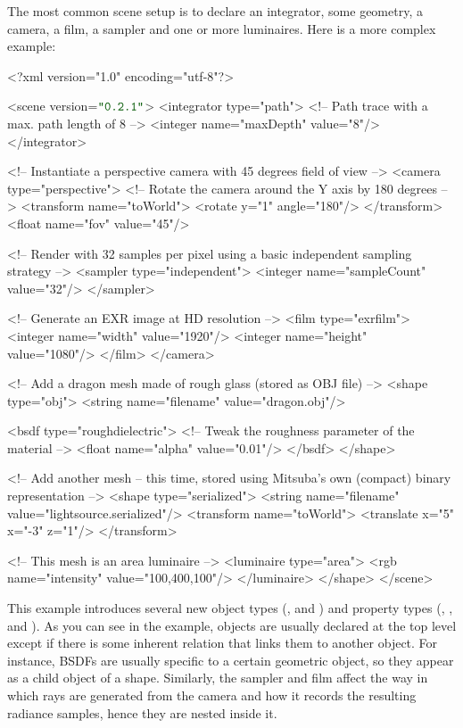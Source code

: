 The most common scene setup is to declare an integrator, some geometry, a camera, a film, a sampler  
and one or more luminaires. Here is a more complex example:
\begin{xml}
<?xml version="1.0" encoding="utf-8"?>

<scene version=$\MtsVer$>
	<integrator type="path">
		<!-- Path trace with a max. path length of 8 -->
		<integer name="maxDepth" value="8"/>
	</integrator>

	<!-- Instantiate a perspective camera with 45 degrees field of view -->
	<camera type="perspective">
		<!-- Rotate the camera around the Y axis by 180 degrees -->
		<transform name="toWorld">
			<rotate y="1" angle="180"/>
		</transform>
		<float name="fov" value="45"/>

		<!-- Render with 32 samples per pixel using a basic
             independent sampling strategy -->
		<sampler type="independent">
			<integer name="sampleCount" value="32"/>
		</sampler>

		<!-- Generate an EXR image at HD resolution -->
		<film type="exrfilm">
			<integer name="width" value="1920"/>
			<integer name="height" value="1080"/>
		</film>
	</camera>

	<!-- Add a dragon mesh made of rough glass (stored as OBJ file) -->
	<shape type="obj">
		<string name="filename" value="dragon.obj"/>

		<bsdf type="roughdielectric">
			<!-- Tweak the roughness parameter of the material -->
			<float name="alpha" value="0.01"/>
		</bsdf>
	</shape>

	<!-- Add another mesh -- this time, stored using Mitsuba's own
	     (compact) binary representation -->
	<shape type="serialized">
		<string name="filename" value="lightsource.serialized"/>
		<transform name="toWorld">
			<translate x="5" x="-3" z="1"/>
		</transform>

		<!-- This mesh is an area luminaire -->
		<luminaire type="area">
			<rgb name="intensity" value="100,400,100"/>
		</luminaire>
	</shape>
</scene>
\end{xml}
\newpage
This example introduces several new object types (, and )
and property types (, , and ). 
As you can see in the example, objects are usually declared at the top level except if there is some
inherent relation that links them to another object. For instance, BSDFs are usually specific to a certain geometric object, so 
they appear as a child object of a shape. Similarly, the sampler and film affect the way in which
rays are generated from the camera and how it records the resulting radiance samples, hence they are nested inside it.

